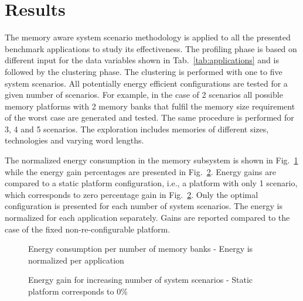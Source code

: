 \documentclass{acm_proc_article-sp}
\begin{document}
\section{Results}
\label{sec:results}

The memory aware system scenario methodology is applied to all the presented benchmark applications to study its effectiveness. The profiling phase is based on different input for the data variables shown in Tab.~\ref{tab:applications} and is followed by the clustering phase. The clustering is performed with one to five system scenarios. All potentially energy efficient configurations are tested for a given number of scenarios. For example, in the case of 2 scenarios all possible memory platforms with 2 memory banks that fulfil the memory size requirement of the worst case are generated and tested. The same procedure is performed for 3, 4 and 5 scenarios. The exploration includes memories of different sizes, technologies and varying word lengths. 

The normalized energy consumption in the memory subsystem is shown in Fig.~\ref{fig:energy} while the energy gain percentages are presented in Fig.~\ref{fig:gains}. Energy gains are compared to a static platform configuration, i.e., a platform with only 1 scenario, which corresponds to zero percentage gain in Fig.~\ref{fig:gains}. Only the optimal configuration is presented for each number of system scenarios. The energy is normalized for each application separately. Gains are reported compared to the case of the fixed non-re-configurable platform.

\begin{figure}[!t]
\centering
\caption{Energy consumption per number of memory banks - Energy is normalized per application}
\label{fig:energy}
\end{figure}

\begin{figure}[!t]
\centering
\caption{Energy gain for increasing number of system scenarios - Static platform corresponds to 0\%}
\label{fig:gains}
\end{figure}
\end{document}

